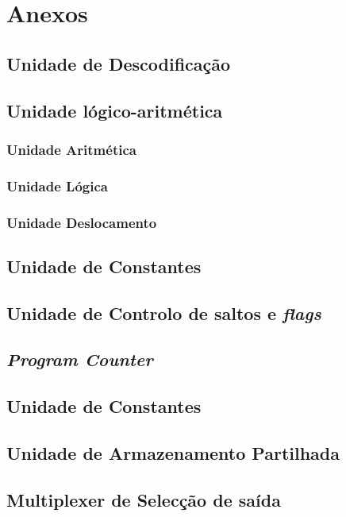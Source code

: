 \chapter{Anexos}
\section{Unidade de Descodificação}

\section{Unidade lógico-aritmética}
\subsection{Unidade Aritmética}

\subsection{Unidade Lógica}

\subsection{Unidade Deslocamento}

\section{Unidade de Constantes}

\section{Unidade de Controlo de saltos e \textit{flags}}

\section{\textit{Program Counter}}

\section{Unidade de Constantes}

\section{Unidade de Armazenamento Partilhada}

\section{Multiplexer de Selecção de saída}


